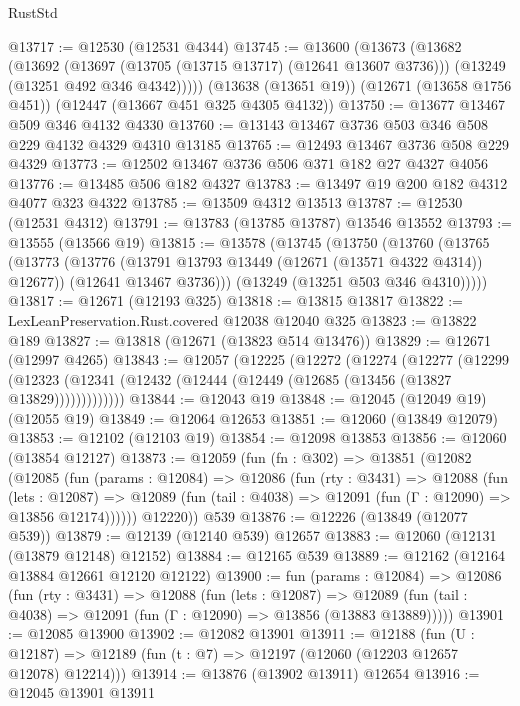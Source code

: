 \begin{lexlean}{RustStd}
\begin{coremodule}
@13717 := @12530 (@12531 @4344)
@13745 := @13600
    (@13673
      (@13682
        (@13692
          (@13697 (@13705 (@13715 @13717) (@12641 @13607 @3736)))
          (@13249 (@13251 @492 @346 @4342)))))
    (@13638 (@13651 @19))
    (@12671 (@13658 @1756 @451))
    (@12447 (@13667 @451 @325 @4305 @4132))
@13750 := @13677 @13467 @509 @346 @4132 @4330
@13760 := @13143 @13467 @3736 @503 @346 @508 @229 @4132 @4329 @4310 @13185
@13765 := @12493 @13467 @3736 @508 @229 @4329
@13773 := @12502 @13467 @3736 @506 @371 @182 @27 @4327 @4056
@13776 := @13485 @506 @182 @4327
@13783 := @13497 @19 @200 @182 @4312 @4077 @323 @4322
@13785 := @13509 @4312 @13513
@13787 := @12530 (@12531 @4312)
@13791 := @13783 (@13785 @13787) @13546 @13552
@13793 := @13555 (@13566 @19)
@13815 := @13578
    (@13745
      (@13750
        (@13760
          (@13765
            (@13773
              (@13776 (@13791 @13793 @13449 (@12671 (@13571 @4322 @4314)) @12677))
              (@12641 @13467 @3736)))
          (@13249 (@13251 @503 @346 @4310)))))
@13817 := @12671 (@12193 @325)
@13818 := @13815 @13817
@13822 := LexLeanPreservation.Rust.covered @12038 @12040 @325
@13823 := @13822 @189
@13827 := @13818 (@12671 (@13823 @514 @13476))
@13829 := @12671 (@12997 @4265)
@13843 := @12057
    (@12225
      (@12272
        (@12274
          (@12277
            (@12299
              (@12323 (@12341 (@12432 (@12444 (@12449 (@12685 (@13456 (@13827 @13829)))))))))))))
@13844 := @12043 @19
@13848 := @12045 (@12049 @19) (@12055 @19)
@13849 := @12064 @12653
@13851 := @12060 (@13849 @12079)
@13853 := @12102 (@12103 @19)
@13854 := @12098 @13853
@13856 := @12060 (@13854 @12127)
@13873 := @12059
    (fun (fn : @302) =>
    @13851
      (@12082
        (@12085
          (fun (params : @12084) =>
          @12086
            (fun (rty : @3431) =>
            @12088
              (fun (lets : @12087) =>
              @12089 (fun (tail : @4038) => @12091 (fun (Γ : @12090) => @13856 @12174))))))
        @12220))
    @539
@13876 := @12226 (@13849 (@12077 @539))
@13879 := @12139 (@12140 @539) @12657
@13883 := @12060 (@12131 (@13879 @12148) @12152)
@13884 := @12165 @539
@13889 := @12162 (@12164 @13884 @12661 @12120 @12122)
@13900 := fun (params : @12084) =>
  @12086
    (fun (rty : @3431) =>
    @12088
      (fun (lets : @12087) =>
      @12089 (fun (tail : @4038) => @12091 (fun (Γ : @12090) => @13856 (@13883 @13889)))))
@13901 := @12085 @13900
@13902 := @12082 @13901
@13911 := @12188
    (fun (U : @12187) => @12189 (fun (t : @7) => @12197 (@12060 (@12203 @12657 @12078) @12214)))
@13914 := @13876 (@13902 @13911) @12654
@13916 := @12045 @13901 @13911

\end{coremodule}
\end{lexlean}
